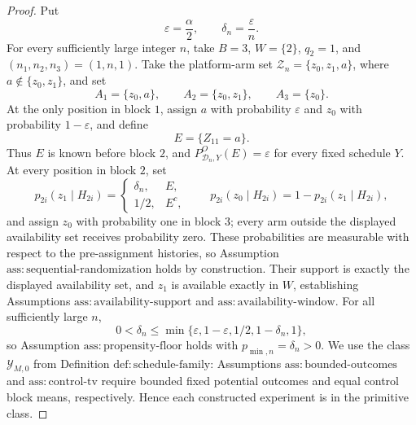 \documentclass{article}
\begin{document}
\begin{proof}
Put
\[
 \varepsilon=\frac{\alpha}{2},
 \qquad
 \delta_n=\frac{\varepsilon}{n}.
\]
For every sufficiently large integer \(n\), take \(B=3\), \(W=\{2\}\), \(q_2=1\), and \((n_1,n_2,n_3)=(1,n,1)\).  Take the platform-arm set \(\mathcal Z_n=\{z_0,z_1,a\}\), where \(a\notin\{z_0,z_1\}\), and set
\[
 A_1=\{z_0,a\},\qquad
 A_2=\{z_0,z_1\},\qquad
 A_3=\{z_0\}.
\]
At the only position in block \(1\), assign \(a\) with probability \(\varepsilon\) and \(z_0\) with probability \(1-\varepsilon\), and define
\[
 E=\{Z_{11}=a\}.
\]
Thus \(E\) is known before block \(2\), and \(P^O_{\mathcal D_n,Y}(E)=\varepsilon\) for every fixed schedule \(Y\).  At every position in block \(2\), set
\[
 p_{2i}(z_1\mid H_{2i})=
 \begin{cases}
  \delta_n,&E,\\
  1/2,&E^c,
 \end{cases}
 \qquad
 p_{2i}(z_0\mid H_{2i})=1-p_{2i}(z_1\mid H_{2i}),
\]
and assign \(z_0\) with probability one in block \(3\); every arm outside the displayed availability set receives probability zero.  These probabilities are measurable with respect to the pre-assignment histories, so Assumption \(\mathrm{ass:sequential\text{-}randomization}\) holds by construction.  Their support is exactly the displayed availability set, and \(z_1\) is available exactly in \(W\), establishing Assumptions \(\mathrm{ass:availability\text{-}support}\) and \(\mathrm{ass:availability\text{-}window}\).  For all sufficiently large \(n\),
\[
 0<\delta_n\le
 \min\{\varepsilon,1-\varepsilon,1/2,1-\delta_n,1\},
\]
so Assumption \(\mathrm{ass:propensity\text{-}floor}\) holds with \(p_{\min,n}=\delta_n>0\).  We use the class \(\mathcal Y_{M,0}\) from Definition \(\mathrm{def:schedule\text{-}family}\): Assumptions \(\mathrm{ass:bounded\text{-}outcomes}\) and \(\mathrm{ass:control\text{-}tv}\) require bounded fixed potential outcomes and equal control block means, respectively.  Hence each constructed experiment is in the primitive class.


\end{proof}
\end{document}
